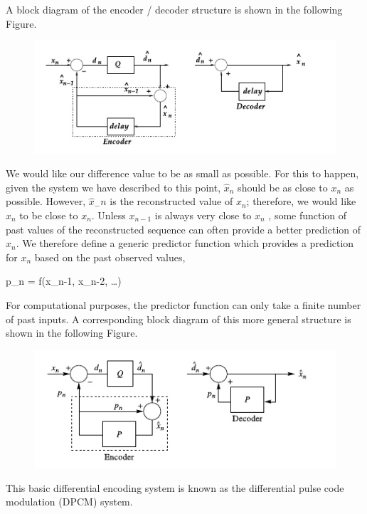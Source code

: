 A block diagram of the encoder / decoder structure is shown in the following Figure.


\begin{figure}[H]
    \centering
    \includegraphics[scale=0.7]{images/2021-08-11-diff_enc_01.png}
\end{figure}

We would like our difference value to be as small as possible. For this to happen, given the system we have described to this point, $\hat x_n$ should be as close to $x_n$ as possible. However, $\hat x_-n$ is the reconstructed value of $x_n$; therefore, we would like $\hat x_n$ to be close to $x_n$. Unless $x_{n-1}$ is always very close to $x_n$ , some function of past values of the reconstructed sequence can often provide a better prediction of $x_n$. We therefore define a generic predictor function which provides a prediction for $x_n$ based on the past observed values,

\bee
p_n = f(\hat x_{n-1}, \hat x_{n-2}, \ldots)
\eee

For computational purposes, the predictor function can only take a finite number of past inputs. A corresponding block diagram of this more general structure is shown in the following Figure.

\begin{figure}[H]
    \centering
    \includegraphics[scale=0.7]{images/2021-08-11-diff_enc_02.png}
\end{figure}

This basic differential encoding system is known as the differential pulse code modulation (DPCM) system.




